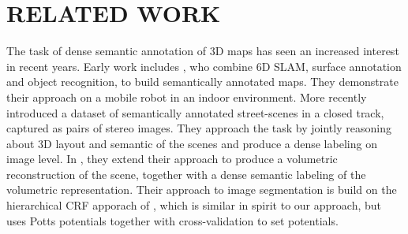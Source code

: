 \documentclass[a4paper, 10pt, conference]{ieeeconf}      %
\begin{document}
\section{RELATED WORK}
The task of dense semantic annotation of 3D maps has seen an increased interest
in recent years.  Early work includes \citet{nuchter2008towards}, who combine
6D SLAM, surface annotation and object recognition, to build semantically
annotated maps. They demonstrate their approach on a mobile robot in an indoor
environment.
%
More recently \citet{sengupta2012automatic} introduced a dataset of
semantically annotated street-scenes in a closed track, captured as pairs of
stereo images. They approach the task by jointly reasoning about 3D layout and
semantic of the scenes and produce a dense labeling on image level.  In
\citet{senguptaurban}, they extend their approach to produce a volumetric
reconstruction of the scene, together with a dense semantic labeling of the
volumetric representation. Their approach to image segmentation is build on
the hierarchical CRF apporach of
\citet{ladicky2009associative}, which is similar in spirit to our approach,
but uses Potts potentials together with cross-validation to set potentials.
\end{document}
